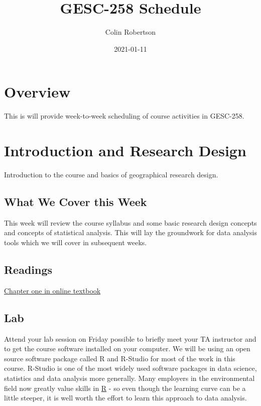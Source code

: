 \documentclass[
]{book}
\title{GESC-258 Schedule}
\author{Colin Robertson}
\date{2021-01-11}
\begin{document}
\maketitle

{
\setcounter{tocdepth}{1}
\tableofcontents
}
\hypertarget{overview}{%
\chapter*{Overview}\label{overview}}

This is will provide week-to-week scheduling of course activities in GESC-258.

\hypertarget{introduction-and-research-design}{%
\chapter{Introduction and Research Design}\label{introduction-and-research-design}}

Introduction to the course and basics of geographical research design.

\hypertarget{what-we-cover-this-week}{%
\section{What We Cover this Week}\label{what-we-cover-this-week}}

This week will review the course syllabus and some basic research design concepts and concepts of statistical analysis. This will lay the groundwork for data analysis tools which we will cover in subsequent weeks.

\hypertarget{readings}{%
\section{Readings}\label{readings}}

\href{http://onlinestatbook.com/2/introduction/introduction.html}{Chapter one in online textbook}

\hypertarget{lab}{%
\section{Lab}\label{lab}}

Attend your lab session on Friday possible to briefly meet your TA instructor and to get the course software installed on your computer. We will be using an open source software package called R and R-Studio for most of the work in this course. R-Studio is one of the most widely used software packages in data science, statistics and data analysis more generally. Many employers in the environmental field now greatly value skills in \href{https://www.r-project.org/}{R} - so even though the learning curve can be a little steeper, it is well worth the effort to learn this approach to data analysis.
\end{document}
